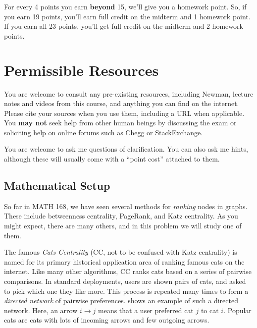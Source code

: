 \documentclass{hw}
\begin{document}
For every 4 points you earn \textbf{beyond} 15, we'll give you a homework point. 
So, if you earn 19 points, you'll earn full credit on the midterm and 1 homework point. 
If you earn all 23 points, you'll get full credit on the midterm and 2 homework points. 


\section*{Permissible Resources}

You are welcome to consult any pre-existing resources, including Newman, lecture notes and videos from this course, and anything you can find on the internet. 
Please cite your sources when you use them, including a URL when applicable. 
You \textbf{may not} seek help from other human beings by discussing the exam or soliciting help on online forums such as Chegg or StackExchange. 

You are welcome to ask me questions of clarification. 
You can also ask me hints, although these will usually come with a ``point cost'' attached to them. 









\pagebreak






\subsection*{Mathematical Setup}

So far in MATH 168, we have seen several methods for \emph{ranking} nodes in graphs. 
These include betweenness centrality, PageRank, and Katz centrality. 
As you might expect, there are many others, and in this problem we will study one of them. 


The famous \emph{Cats Centrality} (CC, not to be confused with Katz centrality) is named for its primary historical application area of ranking famous cats on the internet. 
Like many other algorithms, CC ranks cats based on a series of pairwise comparisons. 
In standard deployments, users are shown pairs of cats, and asked to pick which one they like more. 
This process is repeated many times to form a \emph{directed network} of pairwise preferences. 
 shows an example of such a directed network. 
Here, an arrow $i \rightarrow j$ means that a user preferred cat $j$ to cat $i$. 
Popular cats are cats with lots of incoming arrows and few outgoing arrows. 
\end{document}
